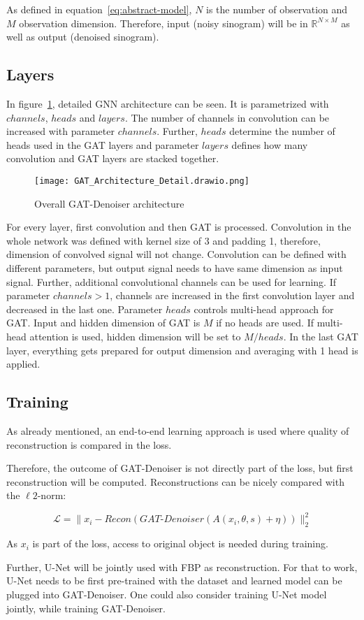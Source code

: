As defined in equation~\ref{eq:abstract-model}, $N$ is the number of observation and
$M$ observation dimension. 
Therefore, input (noisy sinogram) will be in $\mathbb{R}^{N \times M}$ as well as output (denoised sinogram). 

\subsection{Layers}
In figure~\ref{fig:architecture-detailed}, detailed GNN architecture can be seen.
It is parametrized with $channels$, $heads$ and $layers$. 
The number of channels in convolution can be increased with parameter $channels$.
Further, $heads$ determine the number of heads used in the GAT layers and parameter 
$layers$ defines how many convolution and GAT layers are stacked together.


\begin{figure}[H]
  \centering
  \label{fig:architecture-detailed}
  \texttt{[image: GAT\_Architecture\_Detail.drawio.png]}
  \caption{Overall GAT-Denoiser architecture}
\end{figure}


For every layer, first convolution and then GAT is processed. 
Convolution in the whole network was defined with kernel size of 3 and padding 1,
therefore, dimension of convolved signal will not change. 
Convolution can be defined with different parameters, but output signal needs to have 
same dimension as input signal.
Further, additional convolutional channels can be used for learning.
If parameter $channels > 1$, channels are increased in the first convolution layer 
and decreased in the last one.
Parameter $heads$ controls multi-head approach for GAT. Input and hidden dimension
of GAT is $M$ if no heads are used.
If multi-head attention is used, hidden dimension will be set to $M / heads$.
In the last GAT layer, everything gets prepared for output dimension and 
averaging with 1 head is applied.




\subsection{Training}

As already mentioned, an end-to-end learning approach is used where quality of reconstruction is 
compared in the loss.

Therefore, the outcome of GAT-Denoiser is not directly part of the loss, but first reconstruction will be computed.
Reconstructions can be nicely compared with the $\ell2$-norm:

\begin{equation}
  \mathcal{L} = \parallel x_i - \textit{Recon} ( \textit{GAT-Denoiser}(A(x_i, \theta, s) + \eta)) \parallel ^2_2
\end{equation}

As $x_i$ is part of the loss, access to original object is needed during training.

Further, U-Net will be jointly used with FBP as reconstruction. For that to work, U-Net needs to be 
first pre-trained with the dataset and learned model can be plugged into GAT-Denoiser.
One could also consider training U-Net model jointly, while training GAT-Denoiser.


